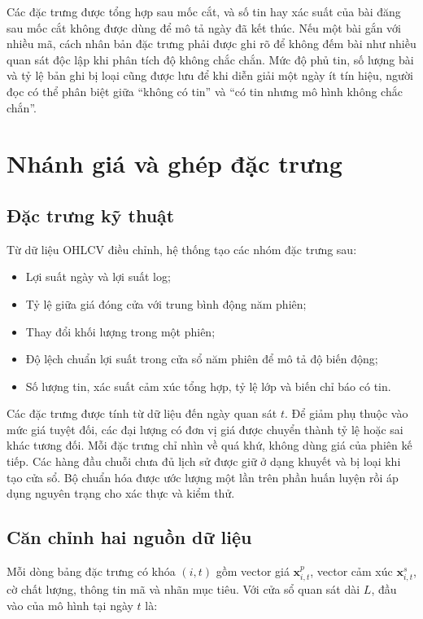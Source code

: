 Các đặc trưng được tổng hợp sau mốc cắt, và số tin hay xác suất của bài đăng sau mốc
cắt không được dùng để mô tả ngày đã kết thúc. Nếu một bài gắn với nhiều mã, cách
nhân bản đặc trưng phải được ghi rõ để không đếm bài như nhiều quan sát độc lập khi
phân tích độ không chắc chắn. Mức độ phủ tin, số lượng bài và tỷ lệ bản ghi bị loại
cũng được lưu để khi diễn giải một ngày ít tín hiệu, người đọc có thể phân biệt giữa
``không có tin'' và ``có tin nhưng mô hình không chắc chắn''.

\section{Nhánh giá và ghép đặc trưng}
\label{sec:pp-ghep}

\subsection{Đặc trưng kỹ thuật}

Từ dữ liệu OHLCV điều chỉnh, hệ thống tạo các nhóm đặc trưng sau:

\begin{itemize}[nosep]
  \item Lợi suất ngày và lợi suất log;
  \item Tỷ lệ giữa giá đóng cửa với trung bình động năm phiên;
  \item Thay đổi khối lượng trong một phiên;
  \item Độ lệch chuẩn lợi suất trong cửa sổ năm phiên để mô tả độ biến động;
  \item Số lượng tin, xác suất cảm xúc tổng hợp, tỷ lệ lớp và biến chỉ báo có tin.
\end{itemize}

Các đặc trưng được tính từ dữ liệu đến ngày quan sát $t$. Để giảm phụ thuộc vào mức
giá tuyệt đối, các đại lượng có đơn vị giá được chuyển thành tỷ lệ hoặc sai khác tương
đối. Mỗi đặc trưng chỉ nhìn về quá khứ, không dùng giá của phiên kế tiếp. Các hàng
đầu chuỗi chưa đủ lịch sử được giữ ở dạng khuyết và bị loại khi tạo cửa sổ. Bộ chuẩn
hóa được ước lượng một lần trên phần huấn luyện rồi áp dụng nguyên trạng cho xác thực
và kiểm thử.

\subsection{Căn chỉnh hai nguồn dữ liệu}

Mỗi dòng bảng đặc trưng có khóa $(i,t)$ gồm vector giá $\mathbf{x}^{p}_{i,t}$, vector
cảm xúc $\mathbf{x}^{s}_{i,t}$, cờ chất lượng, thông tin mã và nhãn mục tiêu. Với
cửa sổ quan sát dài $L$, đầu vào của mô hình tại ngày $t$ là:


